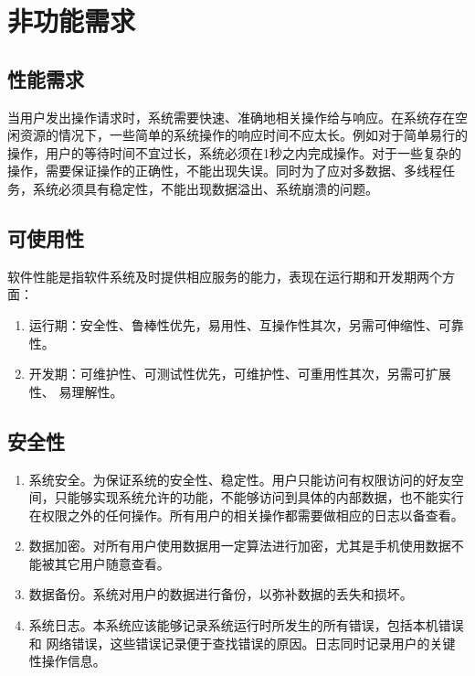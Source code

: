 \section{非功能需求}

\subsection{性能需求}

当用户发出操作请求时，系统需要快速、准确地相关操作给与响应。在系统存在空闲资源的情况下，一些简单的系统操作的响应时间不应太长。例如对于简单易行的操作，用户的等待时间不宜过长，系统必须在1秒之内完成操作。对于一些复杂的操作，需要保证操作的正确性，不能出现失误。同时为了应对多数据、多线程任务，系统必须具有稳定性，不能出现数据溢出、系统崩溃的问题。

\subsection{可使用性}

软件性能是指软件系统及时提供相应服务的能力，表现在运行期和开发期两个方面：

\begin{enumerate}
\item 运行期：安全性、鲁棒性优先，易用性、互操作性其次，另需可伸缩性、可靠性。
\item 开发期：可维护性、可测试性优先，可维护性、可重用性其次，另需可扩展性、
易理解性。
\end{enumerate}

\subsection{安全性}

\begin{enumerate}
\item 系统安全。为保证系统的安全性、稳定性。用户只能访问有权限访问的好友空间，只能够实现系统允许的功能，不能够访问到具体的内部数据，也不能实行在权限之外的任何操作。所有用户的相关操作都需要做相应的日志以备查看。
\item 数据加密。对所有用户使用数据用一定算法进行加密，尤其是手机使用数据不能被其它用户随意查看。
\item 数据备份。系统对用户的数据进行备份，以弥补数据的丢失和损坏。
\item 系统日志。本系统应该能够记录系统运行时所发生的所有错误，包括本机错误和
网络错误，这些错误记录便于查找错误的原因。日志同时记录用户的关键性操作信息。
\end{enumerate}

